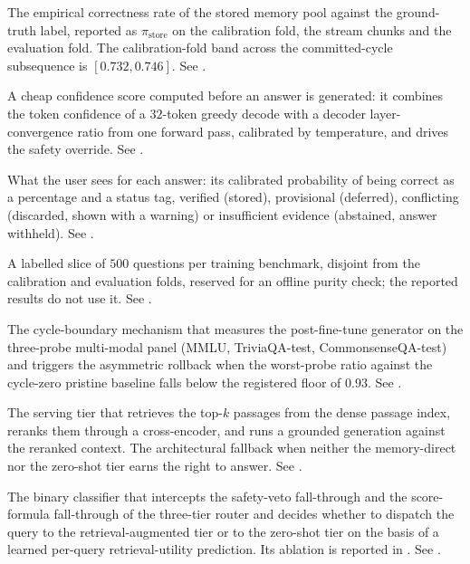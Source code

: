 \begin{description}[style=nextline, leftmargin=0pt, labelindent=0pt, itemsep=6pt, parsep=0pt, font=\bfseries, beginpenalty=10000]
\item[Pool purity:] The empirical correctness rate of the stored memory pool against the ground-truth label, reported as $\pi_{\text{store}}$ on the calibration fold, the stream chunks and the evaluation fold. The calibration-fold band across the committed-cycle subsequence is $[0.732, 0.746]$. See .

\item[Pre-routing confidence (\boldmath$u_{\text{pre}}$):] A cheap confidence score computed before an answer is generated: it combines the token confidence of a $32$-token greedy decode with a decoder layer-convergence ratio from one forward pass, calibrated by temperature, and drives the safety override. See .

\item[Production envelope:] What the user sees for each answer: its calibrated probability of being correct as a percentage and a status tag, verified (stored), provisional (deferred), conflicting (discarded, shown with a warning) or insufficient evidence (abstained, answer withheld). See .

\item[Purity-validation slice:] A labelled slice of $500$ questions per training benchmark, disjoint from the calibration and evaluation folds, reserved for an offline purity check; the reported results do not use it. See .

\item[Retention guard:] The cycle-boundary mechanism that measures the post-fine-tune generator on the three-probe multi-modal panel (MMLU, TriviaQA-test, CommonsenseQA-test) and triggers the asymmetric rollback when the worst-probe ratio against the cycle-zero pristine baseline falls below the registered floor of $0.93$. See .

\item[Retrieval-augmented tier (Tier 3):] The serving tier that retrieves the top-$k$ passages from the dense passage index, reranks them through a cross-encoder, and runs a grounded generation against the reranked context. The architectural fallback when neither the memory-direct nor the zero-shot tier earns the right to answer. See .

\item[Retrieval-utility classifier (RUC):] The binary classifier that intercepts the safety-veto fall-through and the score-formula fall-through of the three-tier router and decides whether to dispatch the query to the retrieval-augmented tier or to the zero-shot tier on the basis of a learned per-query retrieval-utility prediction. Its ablation is reported in . See .


\end{description}

